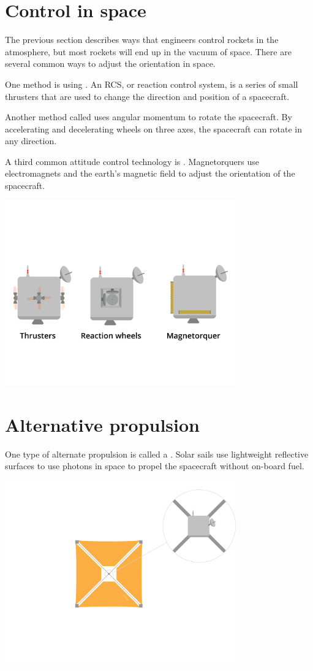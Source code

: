 \section{Control in space}

The previous section describes ways that engineers control rockets in the atmosphere, but most rockets will end up in the vacuum of space. There are several common ways to adjust the orientation in space.

	One method is using . An RCS, or reaction control system, is a series of small thrusters that are used to change the direction and position of a spacecraft. 

	Another method called  uses angular momentum to rotate the spacecraft. By accelerating and decelerating wheels on three axes, the spacecraft can rotate in any direction.

	A third common attitude control technology is . Magnetorquers use electromagnets and the earth's magnetic field to adjust the orientation of the spacecraft. 


\includegraphics[width=0.75\textwidth]{controlSpace.png}



\section{Alternative propulsion}


One type of alternate propulsion is called a . Solar sails use lightweight reflective surfaces to use photons in space to propel the spacecraft without on-board fuel.


\includegraphics[width=0.75\textwidth]{solarSail.png}

